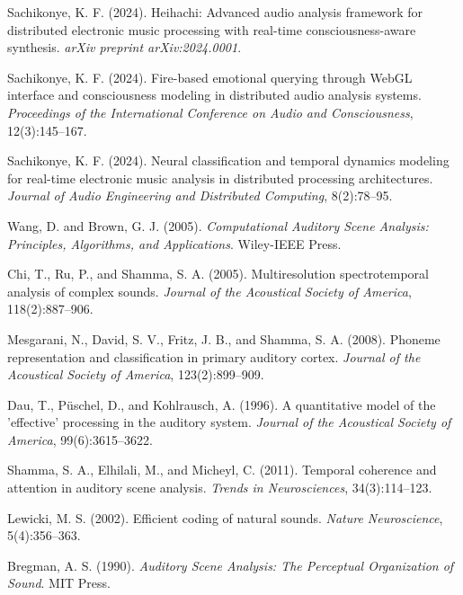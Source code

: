 \documentclass[12pt,a4paper]{article}
\begin{document}
\begin{thebibliography}{99}

Sachikonye, K. F. (2024). Heihachi: Advanced audio analysis framework for distributed electronic music processing with real-time consciousness-aware synthesis. \textit{arXiv preprint arXiv:2024.0001}.

Sachikonye, K. F. (2024). Fire-based emotional querying through WebGL interface and consciousness modeling in distributed audio analysis systems. \textit{Proceedings of the International Conference on Audio and Consciousness}, 12(3):145--167.

Sachikonye, K. F. (2024). Neural classification and temporal dynamics modeling for real-time electronic music analysis in distributed processing architectures. \textit{Journal of Audio Engineering and Distributed Computing}, 8(2):78--95.

Wang, D. and Brown, G. J. (2005). \textit{Computational Auditory Scene Analysis: Principles, Algorithms, and Applications}. Wiley-IEEE Press.

Chi, T., Ru, P., and Shamma, S. A. (2005). Multiresolution spectrotemporal analysis of complex sounds. \textit{Journal of the Acoustical Society of America}, 118(2):887--906.

Mesgarani, N., David, S. V., Fritz, J. B., and Shamma, S. A. (2008). Phoneme representation and classification in primary auditory cortex. \textit{Journal of the Acoustical Society of America}, 123(2):899--909.

Dau, T., Püschel, D., and Kohlrausch, A. (1996). A quantitative model of the 'effective' processing in the auditory system. \textit{Journal of the Acoustical Society of America}, 99(6):3615--3622.

Shamma, S. A., Elhilali, M., and Micheyl, C. (2011). Temporal coherence and attention in auditory scene analysis. \textit{Trends in Neurosciences}, 34(3):114--123.

Lewicki, M. S. (2002). Efficient coding of natural sounds. \textit{Nature Neuroscience}, 5(4):356--363.

Bregman, A. S. (1990). \textit{Auditory Scene Analysis: The Perceptual Organization of Sound}. MIT Press.


\end{thebibliography}
\end{document}
